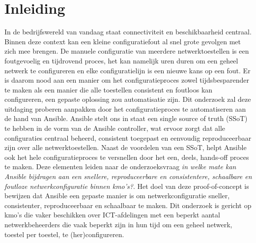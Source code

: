 


% 

\section{Inleiding}%
\label{sec:inleiding}

In de bedrijfswereld van vandaag staat connectiviteit en beschikbaarheid centraal. Binnen deze context kan een kleine configuratiefout al snel grote gevolgen met zich mee brengen. De manuele configuratie van meerdere netwerktoestellen is een foutgevoelig en tijdrovend proces, het kan namelijk uren duren om een geheel netwerk te configureren en elke configuratielijn is een nieuwe kans op een fout.
Er is daarom nood aan een manier om het configuratieproces zowel tijdsbesparender te maken als een manier die alle toestellen consistent en foutloos kan configureren, een gepaste oplossing zou automatisatie zijn.
Dit onderzoek zal deze uitdaging proberen aanpakken door het configuratieproces te automatiseren aan de hand van Ansible. Ansible stelt ons in staat een single source of truth (SSoT) te hebben in de vorm van de Ansible controller, wat ervoor zorgt dat alle configuraties centraal beheerd, consistent toegepast en eenvoudig reproduceerbaar zijn over alle netwerktoestellen.
Naast de voordelen van een SSoT, helpt Ansible ook het hele configuratieproces te versnellen door het een, deels, hands-off proces te maken.
Deze elementen leiden naar de onderzoeksvraag \textit{in welke mate kan Ansible bijdragen aan een snellere, reproduceerbare en consistentere, schaalbare en foutloze netwerkconfiguratie binnen kmo's?}.
Het doel van deze proof-of-concept is bewijzen dat Ansible een gepaste manier is om netwerkconfiguratie sneller, consistenter, reproduceerbaar en schaalbaar te maken.
Dit onderzoek is gericht op kmo's die vaker beschikken over ICT-afdelingen met een beperkt aantal netwerkbeheerders die vaak beperkt zijn in hun tijd om een geheel netwerk, toestel per toestel, te (her)configureren.

